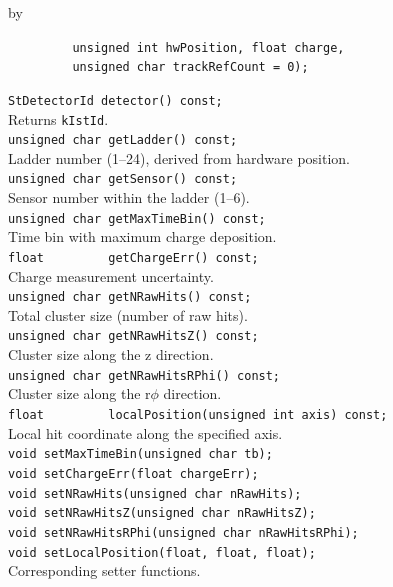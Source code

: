 \documentclass[twoside]{article}
\newcommand{\entrylabel}[1]{\mbox{\textbf{{#1}}}\hfil}%
\newenvironment{entry}
{\begin{list}{}%
    {\renewcommand{\makelabel}{\entrylabel}%
     \setlength{\labelwidth}{90pt}%
     \setlength{\leftmargin}{\labelwidth}
     \advance\leftmargin by \labelsep%
      }%
    }%
  {\end{list}}
\newcommand{\Entrylabel}[1]%
{\raisebox{0pt}[1ex][0pt]{\makebox[\labelwidth][l]%
    {\parbox[t]{\labelwidth}{\hspace{0pt}\textbf{{#1}}}}}}
\newenvironment{Entry}%
{\renewcommand{\entrylabel}{\Entrylabel}\begin{entry}}%
  {\end{entry}}
\begin{document}
\begin{Entry}
    \verb+         unsigned int hwPosition, float charge,+\\
    \verb+         unsigned char trackRefCount = 0);+\\
\item[Public Member\\ Functions]
    \verb+StDetectorId detector() const;+\\
    Returns \verb+kIstId+.\\
    \verb+unsigned char getLadder() const;+\\
    Ladder number (1--24), derived from hardware position.\\
    \verb+unsigned char getSensor() const;+\\
    Sensor number within the ladder (1--6).\\
    \verb+unsigned char getMaxTimeBin() const;+\\
    Time bin with maximum charge deposition.\\
    \verb+float         getChargeErr() const;+\\
    Charge measurement uncertainty.\\
    \verb+unsigned char getNRawHits() const;+\\
    Total cluster size (number of raw hits).\\
    \verb+unsigned char getNRawHitsZ() const;+\\
    Cluster size along the z direction.\\
    \verb+unsigned char getNRawHitsRPhi() const;+\\
    Cluster size along the r$\phi$ direction.\\
    \verb+float         localPosition(unsigned int axis) const;+\\
    Local hit coordinate along the specified axis.\\
    \verb+void setMaxTimeBin(unsigned char tb);+\\
    \verb+void setChargeErr(float chargeErr);+\\
    \verb+void setNRawHits(unsigned char nRawHits);+\\
    \verb+void setNRawHitsZ(unsigned char nRawHitsZ);+\\
    \verb+void setNRawHitsRPhi(unsigned char nRawHitsRPhi);+\\
    \verb+void setLocalPosition(float, float, float);+\\
    Corresponding setter functions.\\
\end{Entry}
\clearpage
\end{document}
